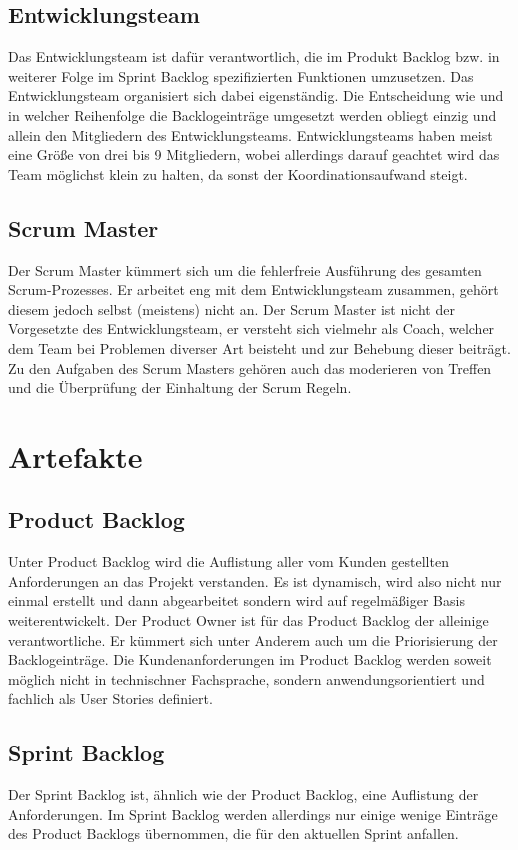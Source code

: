 \documentclass[a4paper, twopage]{scrreprt}
\begin{document}
\subsection{Entwicklungsteam}
Das Entwicklungsteam ist dafür verantwortlich, die im Produkt Backlog bzw. in weiterer Folge im Sprint Backlog spezifizierten Funktionen umzusetzen.
Das Entwicklungsteam organisiert sich dabei eigenständig. Die Entscheidung wie und in welcher Reihenfolge die Backlogeinträge umgesetzt werden obliegt einzig und allein den Mitgliedern des Entwicklungsteams.
Entwicklungsteams haben meist eine Größe von drei bis 9 Mitgliedern, wobei allerdings darauf geachtet wird das Team möglichst klein zu halten, da sonst der Koordinationsaufwand steigt.
\subsection{Scrum Master}
Der Scrum Master kümmert sich um die fehlerfreie Ausführung des gesamten Scrum-Prozesses. Er arbeitet eng mit dem Entwicklungsteam zusammen, gehört diesem jedoch selbst (meistens) nicht an. Der Scrum Master ist nicht der Vorgesetzte des Entwicklungsteam, er versteht sich vielmehr als Coach, welcher dem Team bei Problemen diverser Art beisteht und zur Behebung dieser beiträgt. Zu den Aufgaben des Scrum Masters gehören auch das moderieren von Treffen und die Überprüfung der Einhaltung der Scrum Regeln.

\section{Artefakte}
\subsection{Product Backlog}
Unter Product Backlog wird die Auflistung aller vom Kunden gestellten Anforderungen an das Projekt verstanden. Es ist dynamisch, wird also nicht nur einmal erstellt und dann abgearbeitet sondern wird auf regelmäßiger Basis weiterentwickelt. Der Product Owner ist für das Product Backlog der alleinige verantwortliche. Er kümmert sich unter Anderem auch um die Priorisierung der Backlogeinträge.
Die Kundenanforderungen im Product Backlog werden soweit möglich nicht in technischner Fachsprache, sondern anwendungsorientiert und fachlich als User Stories definiert.
\subsection{Sprint Backlog}
Der Sprint Backlog ist, ähnlich wie der Product Backlog, eine Auflistung der Anforderungen. Im Sprint Backlog werden allerdings nur einige wenige Einträge des Product Backlogs übernommen, die für den aktuellen Sprint anfallen. 
\end{document}
